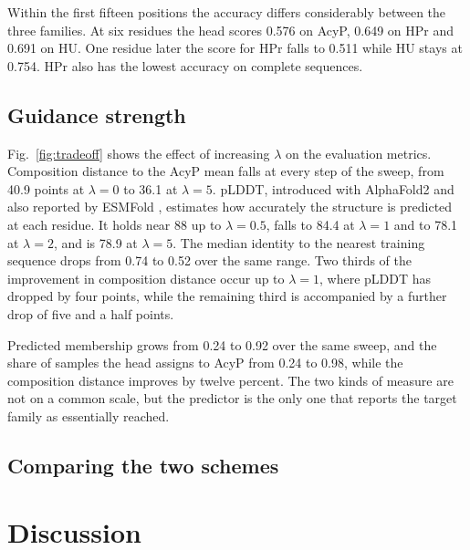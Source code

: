 \documentclass{article}
\begin{document}
Within the first fifteen positions the accuracy differs considerably between the three families.
At six residues the head scores 0.576 on AcyP, 0.649 on HPr and 0.691 on HU.
One residue later the score for HPr falls to 0.511 while HU stays at 0.754.
HPr also has the lowest accuracy on complete sequences.

\subsection{Guidance strength}
\label{ssec:strength}

Fig.~\ref{fig:tradeoff} shows the effect of increasing $\lambda$ on the evaluation metrics.
Composition distance to the AcyP mean falls at every step of the sweep, from 40.9 points at $\lambda = 0$ to 36.1 at $\lambda = 5$.
pLDDT, introduced with AlphaFold2 \cite{jumper2021highly} and also reported by ESMFold \cite{lin2023evolutionary}, estimates how accurately the structure is predicted at each residue.
It holds near 88 up to $\lambda = 0.5$, falls to 84.4 at $\lambda = 1$ and to 78.1 at $\lambda = 2$, and is 78.9 at $\lambda = 5$.
The median identity to the nearest training sequence drops from 0.74 to 0.52 over the same range.
Two thirds of the improvement in composition distance occur up to $\lambda = 1$, where pLDDT has dropped by four points, while the remaining third is accompanied by a further drop of five and a half points.

Predicted membership grows from 0.24 to 0.92 over the same sweep, and the share of samples the head assigns to AcyP from 0.24 to 0.98, while the composition distance improves by twelve percent.
The two kinds of measure are not on a common scale, but the predictor is the only one that reports the target family as essentially reached.


\subsection{Comparing the two schemes}
\label{ssec:comparison}


\section{Discussion}
\label{sec:discussion}
\end{document}
